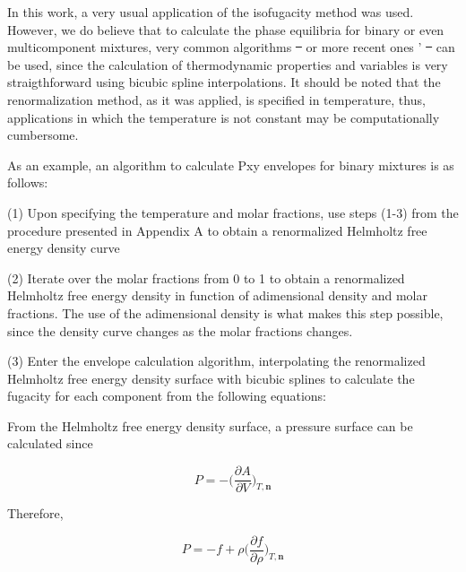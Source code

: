 \documentclass[preprint,12pt,3p]{elsarticle}
\providecommand{\DIFdel}[1]{{\protect\color{red}\sout{#1}}}                      %
\providecommand{\DIFaddbegin}{} %
\providecommand{\DIFaddend}{} %
\providecommand{\DIFdelbegin}{} %
\providecommand{\DIFdelend}{} %
\begin{document}
\begin{appendices}
	In this work, a very usual application of the isofugacity method was used. However, we do believe that to calculate the phase equilibria for binary or even multicomponent mixtures, very common algorithms  \DIFdelbegin \DIFdel{~}\DIFdelend \cite{michelsen1982isothermal1,michelsen1982isothermal} or more recent ones '  \DIFdelbegin \DIFdel{~}\DIFdelend \cite{segtovich2016simultaneous,gupta1991method} can be used, since the calculation of thermodynamic properties and variables is very straigthforward using bicubic spline interpolations. It should be noted that the renormalization method, as it was applied, is specified in temperature, thus, applications in which the temperature is not constant may be computationally cumbersome.

	As an example, an algorithm to calculate Pxy envelopes for binary mixtures is as follows:

	(1) Upon specifying the temperature and molar fractions, use steps (1-3) from the procedure presented in Appendix A to obtain a renormalized Helmholtz free energy density curve

	(2) Iterate over the molar fractions from 0 to 1 to obtain a renormalized Helmholtz free energy density in function of adimensional density and molar fractions. The use of the adimensional density is what makes this step possible, since the density curve changes as the molar fractions changes.

	(3) Enter the envelope calculation algorithm, interpolating the renormalized Helmholtz free energy density surface with bicubic splines to calculate the fugacity for each component from the following equations:

	From the Helmholtz free energy density surface, a pressure surface can be calculated since

\begin{equation} \label{eq:press_helm_deriv}
	P = -\DIFdelbegin %
\DIFdelend \DIFaddbegin \Bigg(\DIFaddend \frac{\partial A}{\partial V}\DIFdelbegin %
\DIFdelend \DIFaddbegin \Bigg)\DIFaddend _{T,\textbf{n}}
\end{equation}

	Therefore,

\begin{equation} \label{eq:press_helm_deriv2}
	P = -f+\rho\DIFdelbegin %
\DIFdelend \DIFaddbegin \Bigg(\DIFaddend \frac{\partial f}{\partial \rho}\DIFdelbegin %
\DIFdelend \DIFaddbegin \Bigg)\DIFaddend _{T,\textbf{n}}
\end{equation}


\end{appendices}
\end{document}
